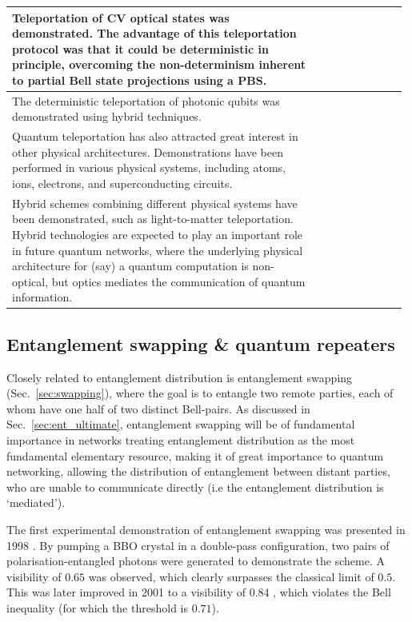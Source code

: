 \documentclass[aps, rmp, twocolumn, amsmath, amssymb, nofootinbib, superscriptaddress, longbibliography, floatfix, table-of-contents, eqsecnum]{revtex4-1}
\begin{document}
\begin{table}[!htb]
\begin{tabular}{|p{0.755\linewidth}|p{0.22\linewidth}|}
	\hline
	Teleportation of CV optical states was demonstrated. The advantage of this teleportation protocol was that it could be deterministic in principle,  overcoming the non-determinism inherent to partial Bell state projections using a PBS. & \cite{bib:Science_282_706} \\
	\hline
	The deterministic teleportation of photonic qubits was demonstrated using hybrid techniques. & \cite{bib:Nat_500_315} \\
	\hline
	Quantum teleportation has also attracted great interest in other physical architectures. Demonstrations have been performed in various physical systems, including atoms, ions, electrons, and superconducting circuits. & \cite{bib:Nat_Phys_9_400, bib:Nat_429_734, bib:Nat_429_737, bib:Science_345_532, bib:Nat_500_319} \\
	\hline
Hybrid schemes combining different physical systems have been demonstrated, such as light-to-matter teleportation. Hybrid technologies are expected to play an important role in future quantum networks, where the underlying physical architecture for (say) a quantum computation is non-optical, but optics mediates the communication of quantum information. & \cite{bib:Nat_443_557, bib:Nat_Comm_4_2744} \\
	\hline
\end{tabular}
\end{table}

%
%

\subsection{Entanglement swapping \& quantum repeaters}  

Closely related to entanglement distribution is entanglement swapping (Sec.~\ref{sec:swapping}), where the goal is to entangle two remote parties, each of whom have one half of two distinct Bell-pairs. As discussed in Sec.~\ref{sec:ent_ultimate}, entanglement swapping will be of fundamental importance in networks treating entanglement distribution as the most fundamental elementary resource, making it of great importance to quantum networking, allowing the distribution of entanglement between distant parties, who are unable to communicate directly (i.e the entanglement distribution is `mediated').

The first experimental demonstration of entanglement swapping was presented in 1998 \cite{bib:PRL_80_3891}. By pumping a BBO crystal in a double-pass configuration, two pairs of polarisation-entangled photons were generated to demonstrate the scheme. A visibility of \mbox{$0.65$} was observed, which clearly surpasses the classical limit of \mbox{$0.5$}. This was later improved in 2001 to a visibility of \mbox{$0.84$} \cite{bib:PRL_86_4435}, which violates the Bell inequality (for which the threshold is $0.71$). 
\end{document}
